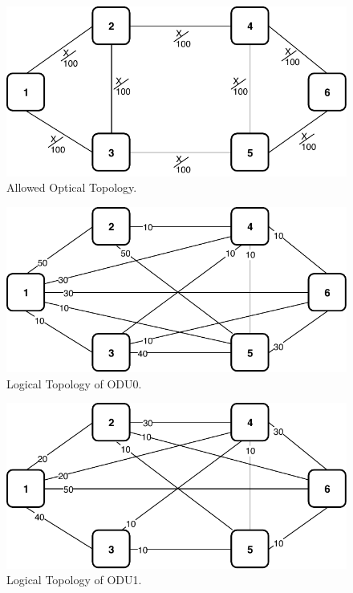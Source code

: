 \begin{figure}[h!]
\centering
\includegraphics[width=12cm]{sdf/ilp/opaque_survivability/figures/allowed_optical_topology}
\caption{Allowed Optical Topology.}
\label{allowed_optical_medium}
\end{figure}

\begin{figure}[h!]
\centering
\includegraphics[width=12cm]{sdf/ilp/opaque_survivability/figures/logical_topology_ODU0_medium}
\caption{Logical Topology of ODU0.}
\label{logical_ODU0_medium}
\end{figure}

\begin{figure}[h!]
\centering
\includegraphics[width=12cm]{sdf/ilp/opaque_survivability/figures/logical_topology_ODU1_medium}
\caption{Logical Topology of ODU1.}
\label{logical_ODU1_medium}
\end{figure}

